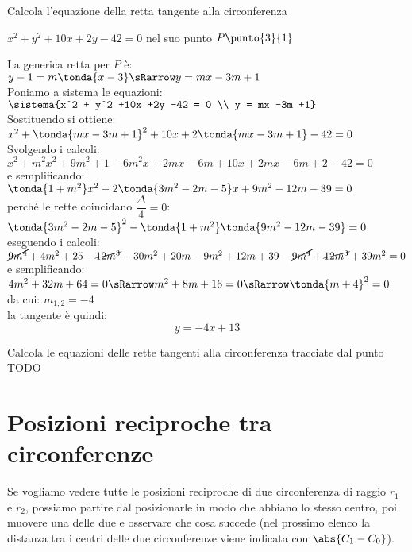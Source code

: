\begin{esempio}
Calcola l'equazione della retta tangente alla circonferenza 

\(x^2 + y^2 +10x +2y -42 = 0\) nel suo punto \(P \punto{3}{1}\)

La generica retta per \(P\) è: \\
\(y -1 = m \tonda{x -3} \sRarrow y = mx -3m +1\) \\
Poniamo a sistema le equazioni: \\  
\(\sistema{x^2 + y^2 +10x +2y -42 = 0 \\ y = mx -3m +1}\) \\ 
Sostituendo si ottiene: \\    
\(x^2 + \tonda{mx -3m +1}^2 +10x +2\tonda{mx -3m +1} -42 = 0\) \\
Svolgendo i calcoli: \\    
\(x^2 + m^2x^2 +9m^2 +1 -6m^2x +2mx -6m +10x +2mx -6m +2 -42 = 0\) \\
e semplificando: \\    
\(\tonda{1 +m^2}x^2 -2\tonda{3m^2 -2m -5}x +9m^2 -12m -39 = 0\) \\
perché le rette coincidano \(\dfrac{\Delta}{4} = 0\): \\ 
\(\tonda{3m^2 -2m -5}^2 -\tonda{1 +m^2}\tonda{9m^2 -12m -39} = 0\) \\
eseguendo i calcoli: \\ 
\(\cancel{9m^4} +4m^2 +25 -\cancel{12m^3} -30m^2 +20m -
9m^2 +12m +39 -\cancel{9m^4} +\cancel{12m^3} +39m^2 = 0\) \\
e semplificando: \\ 
\(4m^2 +32m +64 = 0 \sRarrow m^2 +8m +16 = 0 \sRarrow \tonda{m +4}^2 = 0\) \\
da cui: \(m_{1,2} = -4 \)\\
la tangente è quindi:
\[y = -4x +13\]
\end{esempio}

\begin{esempio}
 Calcola le equazioni delle rette tangenti alla circonferenza tracciate dal 
punto TODO
\end{esempio}

\section{Posizioni reciproche tra circonferenze}
\label{sec:circ_posizionireciproche}

Se vogliamo vedere tutte le posizioni reciproche di due circonferenza  
di raggio \(r_1\) e \(r_2\), possiamo partire dal posizionarle in modo che 
abbiano lo stesso centro, poi muovere una delle due e osservare che cosa 
succede (nel prossimo elenco la distanza tra i centri delle due circonferenze 
viene indicata con \(\abs{C_1 - C_0}\)).

